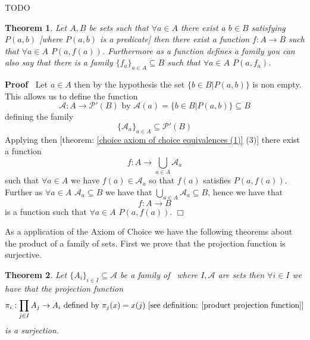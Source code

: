 \documentclass{book}
\newcommand{\tmtextbf}[1]{\text{{\bfseries{#1}}}}
\newenvironment{proof}{\noindent\textbf{Proof\ }}{\hspace*{\fill}$\Box$\medskip}
\newtheorem{theorem}{Theorem}
\begin{document}
TODO

\begin{theorem}
  \label{choice function generating}Let $A, B$ be sets such that $\forall a
  \in A$ there exist a $b \in B$ satisfying $P (a, b)$ [where $P (a, b)$ is a
  predicate] then there exist a function $f : A \rightarrow B$ such that
  $\forall a \in A$ $P (a, f (a))$. Furthermore as a function defines a family
  you can also say that there is a family $\{ f_a \}_{a \in A} \subseteq B$
  such that $\forall a \in A$ $P (a, f_a)$.
\end{theorem}

\begin{proof}
  Let $a \in A$ then by the hypothesis the set $\{ b \in B|P (a, b) \}$ is non
  empty. This allows us to define the function
  \[ \mathcal{A}: A \rightarrow \mathcal{P}' (B) \text{ by } \mathcal{A} (a) =
     \{ b \in B|P (a, b) \} \subseteq B \]
  defining the family
  \[ \{ \mathcal{A}_a \}_{a \in A} \subseteq \mathcal{P}' (B) \]
  Applying then [theorem: \ref{choice axiom of choice equivalences (1)} (3)]
  there exist a function
  \[ f : A \rightarrow \bigcup_{a \in A} \mathcal{A}_a \]
  such that $\forall a \in A$ we have $f (a) \in \mathcal{A}_a$ so that $f
  (a)$ satisfies $P (a, f (a))$. Further as $\forall a \in A$ $\mathcal{A}_a
  \subseteq B$ we have that $\bigcup_{a \in A} \mathcal{A}_a \subseteq B$,
  hence we have that
  \[ f : A \rightarrow B \]
  is a function such that $\forall a \in A$ $P (a, f (a))$.
\end{proof}

As a application of the Axiom of Choice we have the following theorems about
the product of a family of sets. First we prove that the projection function
is surjective.

\begin{theorem}
  \label{product projection is surjective}Let $\{ A_i \}_{i \in I} \subseteq
  \mathcal{A}$ be a family of \tmtextbf{non empty sets} \ where $I,
  \mathcal{A}$ are sets then $\forall i \in I$ we have that the projection
  function
  \[ \pi_i : \prod_{j \in I} A_j \rightarrow A_i \text{ defined by } \pi_j (x)
     = x (j) \text{ [see definition: } \ref{product projection function}
     \text{]} \]
  is a surjection.
\end{theorem}
\end{document}
